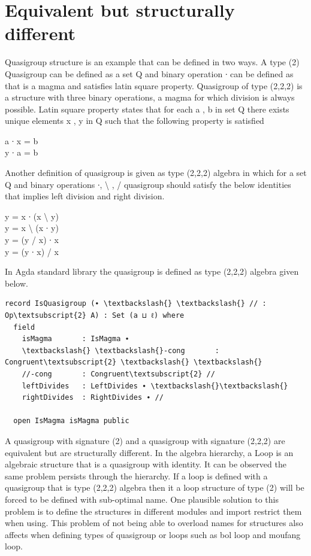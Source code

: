 \section{Equivalent but structurally different}
Quasigroup structure is an example that can be defined in two ways. A type (2) Quasigroup can be defined as a set Q and binary operation ∙ can be defined as that is a magma and satisfies latin square property. Quasigroup of type (2,2,2) is a structure with three binary operations, a magma for which division is always possible. Latin square property states that for each a , b in set Q there exists unique elements x , y in Q such that the following property is satisfied \citep{quasigroupWiki}\\
\begin{center}
a ∙ x = b\\
y ∙ a = b \\
\end{center}
Another definition of quasigroup is given as type (2,2,2) algebra in which for a set Q and binary operations ∙, \textbackslash{} , / quasigroup should satisfy the below identities that implies left division and right division. 
\begin{center}
y = x ∙ (x \textbackslash{} y)\\
y = x \textbackslash{} (x ∙ y)\\
y = (y / x) ∙ x\\
y = (y ∙ x) / x\\
\end{center}
In Agda standard library the quasigroup is defined as type (2,2,2) algebra given below.\\

\begin{BVerbatim}[commandchars=\\\{\}]
record IsQuasigroup (∙ \textbackslash{} \textbackslash{} // : Op\textsubscript{2} A) : Set (a ⊔ ℓ) where
  field
    isMagma       : IsMagma ∙
    \textbackslash{} \textbackslash{}-cong       : Congruent\textsubscript{2} \textbackslash{} \textbackslash{}
    //-cong       : Congruent\textsubscript{2} //
    leftDivides   : LeftDivides ∙ \textbackslash{}\textbackslash{}
    rightDivides  : RightDivides ∙ //

  open IsMagma isMagma public
\end{BVerbatim}

A quasigroup with signature (2) and a quasigroup with signature (2,2,2) are equivalent but are structurally different.  In the algebra hierarchy, a Loop is an algebraic structure that is a quasigroup with identity. It can be observed the same problem persists through the hierarchy. If a loop is defined with a quasigroup that is type (2,2,2) algebra then it a loop structure of type (2) will be forced to be defined with sub-optimal name. One plausible solution to this problem is to define the structures in different modules and import restrict them when using. This problem of not being able to overload names for structures also affects when defining types of quasigroup or loops such as bol loop and moufang loop.\\

